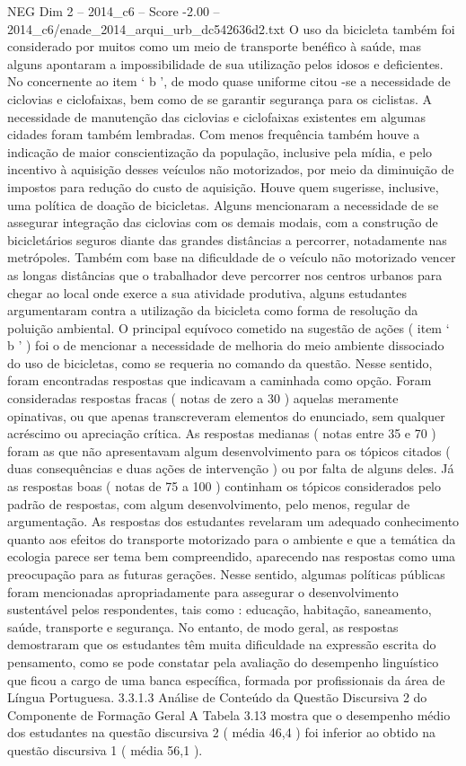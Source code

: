 \begin{textsample}{NEG Dim 2 – 2014\_c6 – Score -2.00 – 2014\_c6/enade\_2014\_arqui\_urb\_dc542636d2.txt}
O uso da bicicleta também foi considerado por muitos como um meio de transporte benéfico à saúde, mas alguns apontaram a impossibilidade de sua utilização pelos idosos e deficientes.
No concernente ao item ‘ b ’, de modo quase uniforme citou -se a necessidade de ciclovias e ciclofaixas, bem como de se garantir segurança para os ciclistas.
A necessidade de manutenção das ciclovias e ciclofaixas existentes em algumas cidades foram também lembradas.
Com menos frequência também houve a indicação de maior conscientização da população, inclusive pela mídia, e pelo incentivo à aquisição desses veículos não motorizados, por meio da diminuição de impostos para redução do custo de aquisição.
Houve quem sugerisse, inclusive, uma política de doação de bicicletas.
Alguns mencionaram a necessidade de se assegurar integração das ciclovias com os demais modais, com a construção de bicicletários seguros diante das grandes distâncias a percorrer, notadamente nas metrópoles.
Também com base na dificuldade de o veículo não motorizado vencer as longas distâncias que o trabalhador deve percorrer nos centros urbanos para chegar ao local onde exerce a sua atividade produtiva, alguns estudantes argumentaram contra a utilização da bicicleta como forma de resolução da poluição ambiental.
O principal equívoco cometido na sugestão de ações ( item ‘ b ’ ) foi o de mencionar a necessidade de melhoria do meio ambiente dissociado do uso de bicicletas, como se requeria no comando da questão.
Nesse sentido, foram encontradas respostas que indicavam a caminhada como opção.
Foram consideradas respostas fracas ( notas de zero a 30 ) aquelas meramente opinativas, ou que apenas transcreveram elementos do enunciado, sem qualquer acréscimo ou apreciação crítica.
As respostas medianas ( notas entre 35 e 70 ) foram as que não apresentavam algum desenvolvimento para os tópicos citados ( duas consequências e duas ações de intervenção ) ou por falta de alguns deles.
Já as respostas boas ( notas de 75 a 100 ) continham os tópicos considerados pelo padrão de respostas, com algum desenvolvimento, pelo menos, regular de argumentação.
As respostas dos estudantes revelaram um adequado conhecimento quanto aos efeitos do transporte motorizado para o ambiente e que a temática da ecologia parece ser tema bem compreendido, aparecendo nas respostas como uma preocupação para as futuras gerações.
Nesse sentido, algumas políticas públicas foram mencionadas apropriadamente para assegurar o desenvolvimento sustentável pelos respondentes, tais como : educação, habitação, saneamento, saúde, transporte e segurança.
No entanto, de modo geral, as respostas demostraram que os estudantes têm muita dificuldade na expressão escrita do pensamento, como se pode constatar pela avaliação do desempenho linguístico que ficou a cargo de uma banca específica, formada por profissionais da área de Língua Portuguesa. 3.3.1.3 Análise de Conteúdo da Questão Discursiva 2 do Componente de Formação Geral A Tabela 3.13 mostra que o desempenho médio dos estudantes na questão discursiva 2 ( média 46,4 ) foi inferior ao obtido na questão discursiva 1 ( média 56,1 ).

\end{textsample}
